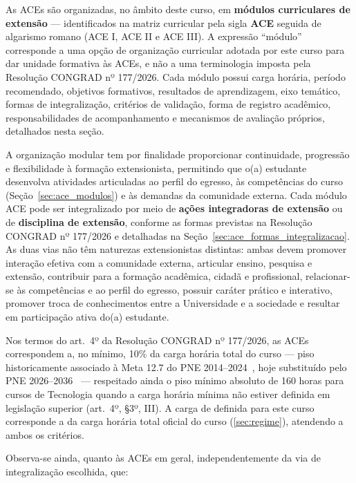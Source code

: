 As ACEs são organizadas, no âmbito deste curso, em \textbf{módulos curriculares de extensão} — identificados na matriz curricular pela sigla \textbf{ACE} seguida de algarismo romano (ACE I, ACE II e ACE III). A expressão ``módulo'' corresponde a uma opção de organização curricular adotada por este curso para dar unidade formativa às ACEs, e não a uma terminologia imposta pela Resolução CONGRAD nº 177/2026. Cada módulo possui carga horária, período recomendado, objetivos formativos, resultados de aprendizagem, eixo temático, formas de integralização, critérios de validação, forma de registro acadêmico, responsabilidades de acompanhamento e mecanismos de avaliação próprios, detalhados nesta seção.

A organização modular tem por finalidade proporcionar continuidade, progressão e flexibilidade à formação extensionista, permitindo que o(a) estudante desenvolva atividades articuladas ao perfil do egresso, às competências do curso (Seção~\ref{sec:ace_modulos}\unskip) e às demandas da comunidade externa. Cada módulo ACE pode ser integralizado por meio de \textbf{ações integradoras de extensão} ou de \textbf{disciplina de extensão}, conforme as formas previstas na Resolução CONGRAD nº 177/2026 e detalhadas na Seção~\ref{sec:ace_formas_integralizacao}. As duas vias não têm naturezas extensionistas distintas: ambas devem promover interação efetiva com a comunidade externa, articular ensino, pesquisa e extensão, contribuir para a formação acadêmica, cidadã e profissional, relacionar-se às competências e ao perfil do egresso, possuir caráter prático e interativo, promover troca de conhecimentos entre a Universidade e a sociedade e resultar em participação ativa do(a) estudante.

Nos termos do art.\ 4º da Resolução CONGRAD nº 177/2026, as ACEs correspondem a, no mínimo, 10\% da carga horária total do curso — piso historicamente associado à Meta 12.7 do PNE 2014--2024~\cite{mec_pne_2014}, hoje substituído pelo PNE 2026--2036~\cite{mec_pne_2026} — respeitado ainda o piso mínimo absoluto de 160 horas para cursos de Tecnologia quando a carga horária mínima não estiver definida em legislação superior (art.\ 4º, §3º, III). A carga de \textbf{} definida para este curso corresponde a  da carga horária total oficial do curso (\ref{sec:regime}\unskip), atendendo a ambos os critérios.

Observa-se ainda, quanto às ACEs em geral, independentemente da via de integralização escolhida, que:


